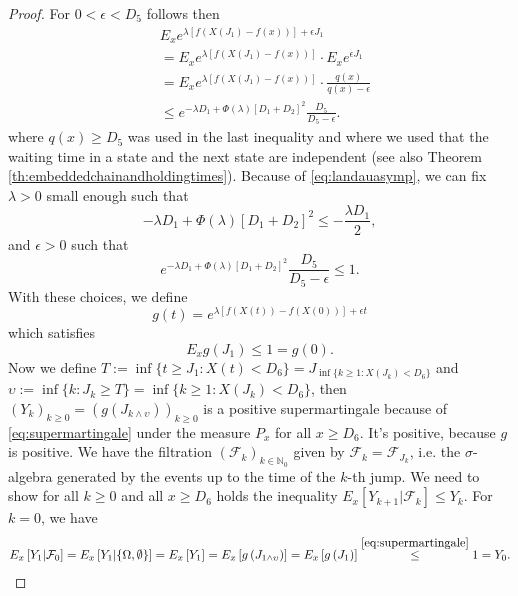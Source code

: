 \documentclass[12pt,a4paper]{scrartcl}
\numberwithin{equation}{section}
\newcommand{\N}{\mathbb{N}} %
\begin{document}
\begin{proof}
For $ 0 < \epsilon < D_5$ follows then
\begin{align*}
&E_x e^{\lambda\left[f\left(X\left(J_1\right) - f\left(x\right) \right) \right] + \epsilon J_1}\\
&= E_x e^{\lambda\left[f\left(X\left(J_1\right) - f\left(x\right) \right) \right]} \cdot E_x e^{\epsilon J_1}\\
&= E_x e^{\lambda\left[f\left(X\left(J_1\right) - f\left(x\right) \right) \right]} \cdot \frac{q\left(x\right)}{q\left(x\right) - \epsilon}\\
&\leq e^{-\lambda D_1 + \Phi\left(\lambda\right) \left[D_1 + D_2 \right]^2} \frac{D_5}{D_5 - \epsilon}.
\end{align*}
where $q\left(x\right) \geq D_5$ was used in the last inequality and where we used that the waiting time in a state and the next state are independent (see also Theorem \ref{th:embeddedchainandholdingtimes}). 
Because of \eqref{eq:landauasymp}, we can fix $\lambda > 0$ small enough such that
$$ -\lambda D_1 + \Phi\left(\lambda\right) \left[D_1 + D_2 \right]^2 \leq - \frac{\lambda D_1}{2}, $$
and $\epsilon > 0$ such that
$$ e^{-\lambda D_1 + \Phi\left(\lambda\right) \left[D_1 + D_2 \right]^2} \frac{D_5}{D_5 - \epsilon} \leq  1.$$
With these choices, we define
$$g\left(t\right) = e^{\lambda\left[f\left(X\left(t\right) \right) - f\left(X\left(0\right)\right) \right] + \epsilon t}$$
which satisfies
\begin{equation} \label{eq:supermartingale}
E_x g\left(J_1\right) \leq 1 = g\left(0\right).
\end{equation}
Now we define $T:= \inf\lbrace t \geq J_1 : X\left(t\right) < D_6 \rbrace = J_{\inf\lbrace k\geq 1: X\left(J_k\right) < D_6 \rbrace}$ and $\upsilon := \inf \lbrace k: J_k \geq T\rbrace = \inf\lbrace k \geq 1 : X\left(J_k \right) < D_6 \rbrace  $,
then $\left(Y_k\right)_{k \geq 0} =\left(g\left(J_{k \wedge \upsilon} \right)\right)_{ k \geq 0} $ is a positive supermartingale because of \eqref{eq:supermartingale} under the measure $P_x$ for all $x \geq D_6$.
It's positive, because $g$ is positive. We have the filtration $\left( \mathcal{F}_k \right)_{k \in \N_0}$ given by $ \mathcal{F}_k = \mathcal{F}_{J_k}$, i.e. the $\sigma$-algebra generated by the events up to the time of the $k$-th jump. We need to show for all $k \geq 0$ and all $x \geq D_6$ holds the inequality $E_x\left[Y_{k+1} | \mathcal{F}_k \right] \leq Y_k.$
For $k=0$, we have 
\begin{align*}
E_x\left[Y_1 | \mathcal{F}_0 \right] = E_x\left[ Y_1 | \lbrace \Omega, \emptyset \rbrace \right] = E_x\left[Y_1 \right] = E_x\left[g\left(J_{1 \wedge \upsilon} \right) \right] = E_x\left[g\left(J_1 \right) \right] \overset{\eqref{eq:supermartingale}}{\leq} 1 = Y_0.

\end{align*}
\end{proof}
\end{document}
